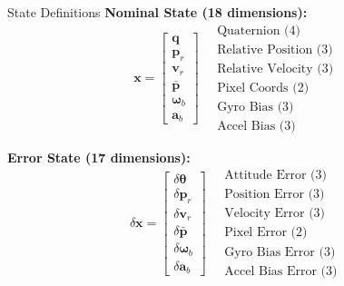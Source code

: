 \documentclass{beamer}
\newcommand{\quat}{\mathbf{q}}
\newcommand{\pr}{\mathbf{p}_r}
\newcommand{\vr}{\mathbf{v}_r}
\newcommand{\pbar}{\bar{\mathbf{p}}}
\newcommand{\bgyr}{\bm{\omega}_b}
\newcommand{\bacc}{\mathbf{a}_b}
\begin{document}
\begin{frame}{State Definitions}
\textbf{Nominal State (18 dimensions):}
\begin{equation*}
    \mathbf{x} = \begin{bmatrix} \quat \\ \pr \\ \vr \\ \pbar \\ \bgyr \\ \bacc \end{bmatrix}
    \quad
    \begin{array}{l}
        \text{Quaternion (4)} \\
        \text{Relative Position (3)} \\
        \text{Relative Velocity (3)} \\
        \text{Pixel Coords (2)} \\
        \text{Gyro Bias (3)} \\
        \text{Accel Bias (3)}
    \end{array}
\end{equation*}

\vspace{0.5cm}
\textbf{Error State (17 dimensions):}
\begin{equation*}
    \delta\mathbf{x} = \begin{bmatrix} \delta\bm{\theta} \\ \delta\pr \\ \delta\vr \\ \delta\pbar \\ \delta\bgyr \\ \delta\bacc \end{bmatrix}
    \quad
    \begin{array}{l}
        \text{Attitude Error (3)} \\
        \text{Position Error (3)} \\
        \text{Velocity Error (3)} \\
        \text{Pixel Error (2)} \\
        \text{Gyro Bias Error (3)} \\
        \text{Accel Bias Error (3)}
    \end{array}
\end{equation*}
\end{frame}
\end{document}

